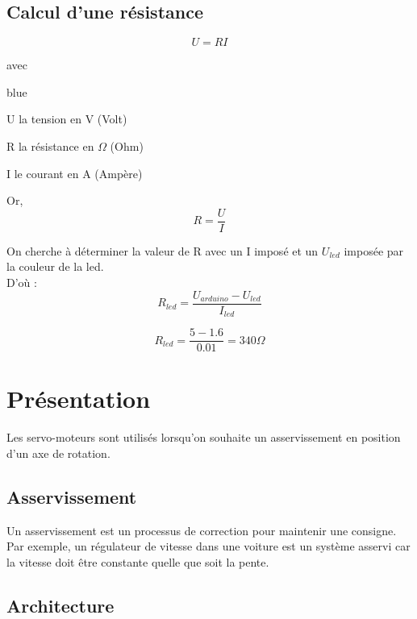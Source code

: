 \section{Calcul d'une résistance}


$$ U = RI $$

avec 

\begin{items}{blue}{\Triangle}
    \item U la tension en V (Volt)
    \item R la résistance en $\Omega$ (Ohm)
    \item I le courant en A (Ampère)
\end{items}

Or, 
$$ R = \frac{U}{I} $$

On cherche à déterminer la valeur de R avec un I imposé et un $U_{led}$ imposée par la couleur de la led. \\
D'où : 
$$ R_{led} = \frac{U_{arduino} - U_{led}}{I_{led}}$$

$$ R_{led} = \frac{5-1.6}{0.01} = 340 \Omega$$%
\chapter{Présentation}

\newcommand{\servo}{servo-moteurs } 


Les \servo sont utilisés lorsqu'on souhaite un asservissement en position d'un axe de rotation.



\section{Asservissement}

Un asservissement est un processus de correction pour maintenir une consigne. \\
Par exemple, un régulateur de vitesse dans une voiture est un système asservi car la vitesse 
doit être constante quelle que soit la pente.


\section{Architecture}


